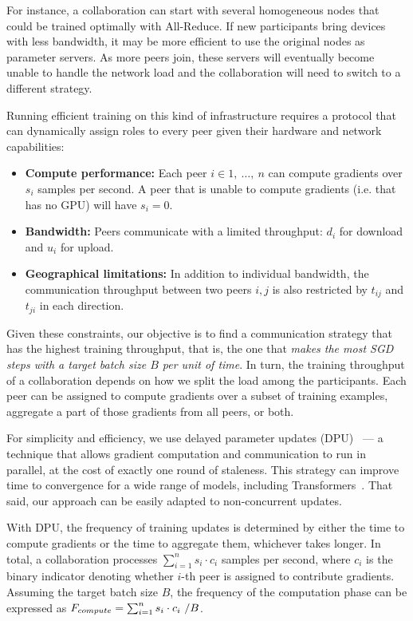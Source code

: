 For instance, a collaboration can start with several homogeneous nodes that could be trained optimally with All-Reduce. If new participants bring devices with less bandwidth, it may be more efficient to use the original nodes as parameter servers. As more peers join, these servers will eventually become unable to handle the network load and the collaboration will need to switch to a different strategy.

Running efficient training on this kind of infrastructure requires a protocol that can dynamically assign roles to every peer given their hardware and network capabilities:
\begin{itemize}[leftmargin=*]
    \item \textbf{Compute performance:} Each peer $i \in 1,\ \dots,\ n$ can compute gradients over $s_i$ samples per second. A peer that is unable to compute gradients (i.e. that has no GPU) will have $s_i{=}0$.
    \item \textbf{Bandwidth:} Peers communicate with a limited throughput: $d_i$ for download and $u_i$ for upload.
    \item \textbf{Geographical limitations:} In addition to individual bandwidth, the communication throughput between two peers $i, j$ is also restricted by $t_{i j}$ and $t_{j i}$ in each direction.
\end{itemize}

Given these constraints, our objective is to find a communication strategy that has the highest training throughput, that is, the one that \textit{makes the most SGD steps with a target batch size $B$ per unit of time}. In turn, the training throughput of a collaboration depends on how we split the load among the participants. Each peer can be assigned to compute gradients over a subset of training examples, aggregate a part of those gradients from all peers, or both.

For simplicity and efficiency, we use delayed parameter updates (DPU)~\cite{zerooffload} --- a technique that allows gradient computation and communication to run in parallel, at the cost of exactly one round of staleness. This strategy can improve time to convergence for a wide range of models, including Transformers~\cite{zerooffload,aji2019making}. That said, our approach can be easily adapted to non-concurrent updates.

With DPU, the frequency of training updates is determined by either the time to compute gradients or the time to aggregate them, whichever takes longer. In total, a collaboration processes $\sum_{i=1}^{n} s_i \cdot c_i$ samples per second, where $c_i$ is the binary indicator denoting whether $i$-th peer is assigned to contribute gradients. Assuming the target batch size $B$, the frequency of the computation phase can be expressed as $F_{compute} = \sum_{i=1}^{n} s_i \cdot c_i \text{  } / \space B$.

